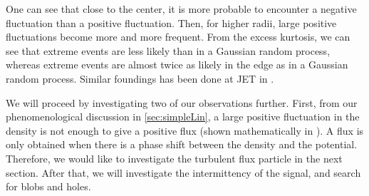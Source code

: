 One can see that close to the center, it is more probable to encounter a negative fluctuation than a positive fluctuation.
Then, for higher radii, large positive fluctuations become more and more frequent.
From the excess kurtosis, we can see that extreme events are less likely than in a Gaussian random process, whereas extreme events are almost twice as likely in the edge as in a Gaussian random process.
Similar foundings has been done at JET in \cite{Xu2009}.

We will proceed by investigating two of our observations further.
First, from our phenomenological discussion in \cref{sec:simpleLin}, a large positive fluctuation in the density is not enough to give a positive flux (shown mathematically in \cite{Garcia2001a}).
A flux is only obtained when there is a phase shift between the density and the potential.
Therefore, we would like to investigate the turbulent flux particle in the next section.
After that, we will investigate the intermittency of the signal, and search for blobs and holes.
